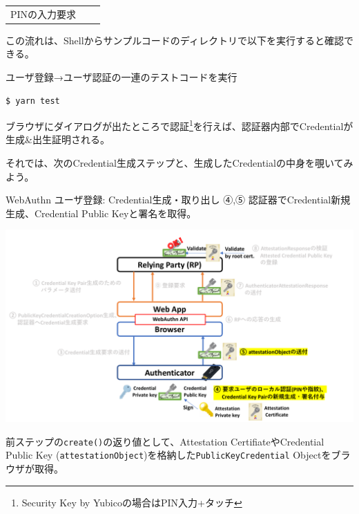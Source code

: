 \documentclass[12pt,dvipdfmx,uplatex]{beamer}
\begin{document}
\begin{frame}[fragile]
\begin{tabular}{ccc}
\begin{minipage}{0.4\linewidth}
 {\footnotesize PINの入力要求}
\end{minipage}
\end{tabular}
\end{frame}

\begin{frame}[fragile]
この流れは、Shellからサンプルコードのディレクトリで以下を実行すると確認できる。
\begin{exampleblock}{\footnotesize ユーザ登録→ユーザ認証の一連のテストコードを実行}
{\footnotesize
\begin{verbatim}
$ yarn test
\end{verbatim}
}
\end{exampleblock}

\vspace{2ex}
ブラウザにダイアログが出たところで認証\footnote[frame]{\scriptsize Security Key by Yubicoの場合はPIN入力+タッチ}を行えば、\alert{認証器内部でCredentialが生成\&出生証明される。}

\vspace{2ex}
それでは、次のCredential生成ステップと、生成したCredentialの中身を覗いてみよう。
\end{frame}

\begin{frame}{WebAuthn ユーザ登録: Credential生成・取り出し}
\small
④,⑤ 認証器でCredential新規生成、Credential Public Keyと署名を取得。
\begin{center}
 \includegraphics[width=0.9\linewidth]{Figs/webauthn-registration3.pdf}
\end{center}
前ステップの\texttt{create()}の返り値として、Attestation CertifiateやCredential Public Key (\texttt{attestationObject})を格納した\texttt{PublicKeyCredential} Objectをブラウザが取得。
\end{frame}
\end{document}
